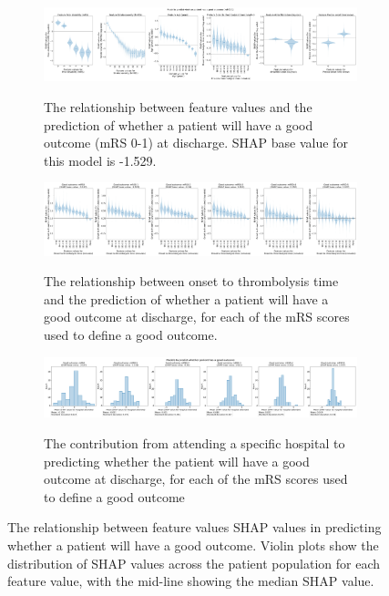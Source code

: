\begin{figure}
    \centering
    \begin{subfigure}[b]{0.8\textwidth}
      \centering
      \includegraphics[trim={0 0 0 1.2cm}, clip, width=1\textwidth]{./images/p3_clin_shap_sub_1}\\
      \caption{The relationship between feature values and the prediction of whether a patient will have a good outcome (mRS 0-1) at discharge. SHAP base value for this model is -1.529.}
      \label{fig:global_shap_mrs1}
    \end{subfigure}
    \hfill
    \begin{subfigure}[b]{0.8\textwidth}
      \centering    
      \includegraphics[width=1\textwidth]{./images/p3_clin_shap_sub_2.jpg}\\
      \caption{The relationship between onset to thrombolysis time and the prediction of whether a patient will have a good outcome at discharge, for each of the mRS scores used to define a good outcome.}
      \label{fig:global_shap_ott}
    \end{subfigure}
    \hfill
    \begin{subfigure}[b]{0.8\textwidth}
      \centering
      \includegraphics[trim={0 0 0 1.2cm}, clip, width=1\textwidth]{./images/p3_clin_shap_sub_3}\\
      \caption{The contribution from attending a specific hospital to predicting whether the patient will have a good outcome at discharge, for each of the mRS scores used to define a good outcome}
      \label{fig:global_shap_hosp}
    \end{subfigure}
    \label{fig:global_shap_trio}
  \caption{The relationship between feature values SHAP values in predicting whether a patient will have a good outcome. Violin plots show the distribution of SHAP values across the patient population for each feature value, with the mid-line showing the median SHAP value.} 
\end{figure}

